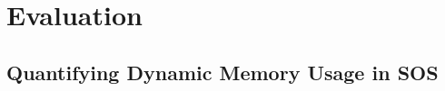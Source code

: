 \section{Evaluation}
\label{sec:eval}


\subsection{Quantifying Dynamic Memory Usage in SOS}

    






    



